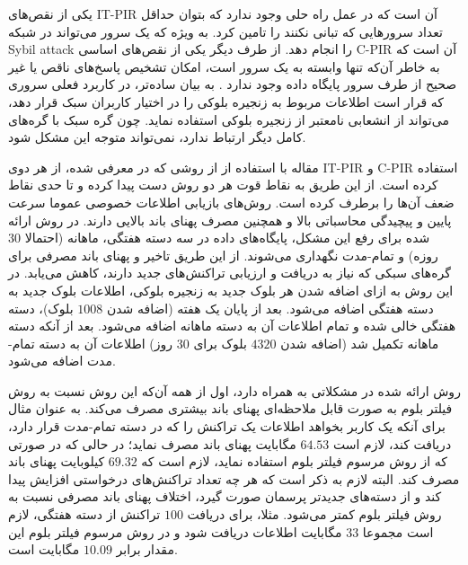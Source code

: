 یکی از نقص‌های IT-PIR آن است که در عمل راه حلی وجود ندارد که بتوان حداقل تعداد سرورهایی که تبانی نکنند را تامین کرد. به ویژه که یک سرور می‌تواند در شبکه 
\gls{Sybil attack}
را انجام دهد. از طرف دیگر یکی از نقص‌های اساسی C-PIR آن است که به خاطر آن‌که تنها وابسته به یک سرور است، امکان تشخیص پاسخ‌های ناقص یا غیر صحیح از طرف سرور پایگاه داده وجود ندارد \cite{Qin2019}. به بیان ساده‌تر، در کاربرد فعلی سروری که قرار است اطلاعات مربوط به زنجیره بلوکی را در اختیار کاربران سبک قرار دهد،‌ می‌تواند از انشعابی نامعتبر از زنجیره بلوکی استفاده نماید. چون گره سبک با گره‌های کامل دیگر ارتباط ندارد، نمی‌تواند متوجه این مشکل شود.

مقاله \cite{Qin2019} با استفاده از از روشی که در \cite{Devet2014} معرفی شده، از هر دوی  IT-PIR و  C-PIR استفاده کرده است. از این طریق به نقاط قوت هر دو روش دست پیدا کرده و تا حدی نقاط ضعف آن‌ها را برطرف کرده است. روش‌های بازیابی اطلاعات خصوصی عموما سرعت پایین و پیچیدگی محاسباتی بالا و همچنین مصرف پهنای باند بالایی دارند. در روش ارائه شده  \cite{Qin2019} برای رفع این مشکل، پایگاه‌های داده‌ در سه دسته هفتگی، ماهانه (احتمالا
$30$
روزه) و تمام-مدت نگهداری می‌شوند. از این طریق تاخیر و پهنای باند مصرفی برای گره‌های سبکی که نیاز به دریافت و ارزیابی تراکنش‌های جدید دارند، کاهش می‌یابد. در این روش به ازای اضافه شدن هر بلوک جدید به زنجیره بلوکی، اطلاعات بلوک جدید به دسته هفتگی اضافه می‌شود. بعد از پایان یک هفته (اضافه شدن $1008$ بلوک)، دسته هفتگی خالی شده و تمام اطلاعات آن به دسته ماهانه اضافه می‌شود. بعد از آنکه دسته ماهانه تکمیل شد (اضافه شدن $4320$ بلوک برای $30$ روز) اطلاعات آن به دسته تمام-مدت اضافه می‌شود. 


روش ارائه شده در \cite{Qin2019} مشکلاتی به همراه دارد، اول از همه آن‌که این روش نسبت به روش فیلتر بلوم \cite{Hearn2013} به صورت قابل ملاحظه‌ای پهنای باند بیشتری مصرف می‌کند. به عنوان مثال برای آنکه یک کاربر بخواهد اطلاعات یک تراکنش را که در دسته تمام-مدت قرار دارد، دریافت کند، لازم است $64.53$ مگابایت پهنای باند مصرف نماید؛ در حالی که در صورتی که از روش مرسوم فیلتر بلوم استفاده نماید، لازم است که $69.32$ کیلوبایت پهنای باند مصرف کند. البته لازم به ذکر است که هر چه تعداد تراکنش‌های درخواستی افزایش پیدا کند و از دسته‌های جدیدتر پرسمان صورت گیرد، اختلاف پهنای باند مصرفی نسبت به روش فیلتر بلوم کمتر می‌شود. مثلا، برای دریافت $100$ تراکنش از دسته هفتگی، لازم است مجموعا $33$ مگابایت اطلاعات دریافت شود و در روش مرسوم فیلتر بلوم این مقدار برابر $10.09$ مگابایت است.

